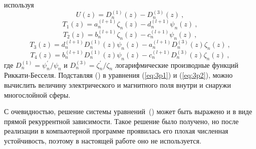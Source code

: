 используя
\begin{equation*}
  U(z) =    {D^{(1)}_{n}}(z) - {D^{(3)}_{n}}(z)\:,
\end{equation*}
\begin{equation*}
  T_1(z) =   a^{(l+1)}_{n}  \zeta_{n}(z) 
           - d^{(l+1)}_{n}  \psi_{n}(z)\:,
\end{equation*}
\begin{equation*}
  T_2(z) =   b^{(l+1)}_{n}  \zeta_{n}(z) 
           - c^{(l+1)}_{n}  \psi_{n}(z)\:,
\end{equation*}
\begin{equation*}
  T_3(z) =  d^{(l+1)}_{n}  D^{(1)}_{n}(z)  \psi_{n}(z) 
          - a^{(l+1)}_{n}  D^{(3)}_{n}(z)  \zeta_{n} (z)\:,
\end{equation*}
\begin{equation*}
  T_4(z) =  b^{(l+1)}_{n}  D^{(1)}_{n}(z)  \psi_{n}(z) 
          - c^{(l+1)}_{n}  D^{(3)}_{n}(z)  \zeta_{n} (z)\:,
\end{equation*}
где  $D^{(1)}_{n} = \psi^{\prime}_{n}/\psi_{n}$ и
$D^{(3)}_{n} = \zeta^{\prime}_{n}/\zeta_{n}$ логарифмические
производные функций Риккати-Бесселя. Подставляя
() в уравнения (\ref{eq:3p1}) и
(\ref{eq:3p2}), можно вычислить величину электрического и магнитного
поля внутри и снаружи многослойной сферы.

С очевидностью, решение системы
уравнений~() может быть
выражено и в виде прямой рекуррентной зависимости. Такое решение было
получено, но после реализации в компьютерной программе проявилась
его плохая численная устойчивость, поэтому в настоящей работе
оно не используется.

